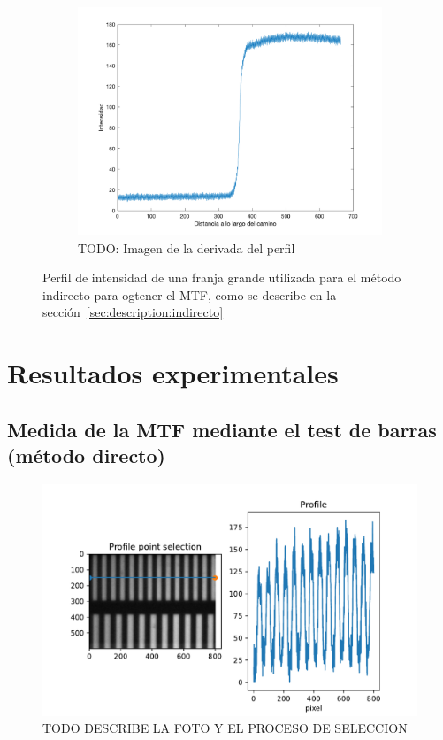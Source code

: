 \documentclass{./packages/optica-article}
\begin{document}
\begin{figure}[hptb]
\begin{subfigure}[b]{0.25\textwidth}
		\includegraphics[width=\textwidth]{edge_perfil}
		\caption{TODO: Imagen de la derivada del perfil}
		\label{fig:perfil:lsf}
	\end{subfigure}
	\caption{Perfil de intensidad de una franja grande utilizada para el método indirecto para ogtener el MTF, como se describe en la sección~\ref{sec:description:indirecto}}
	\label{fig:perfil}
\end{figure}

\section{Resultados experimentales}

\subsection{Medida de la MTF mediante el test de barras (método directo)}\label{sec:mtf-directo}



\begin{figure}[p]
	\includegraphics[width=\textwidth]{profile-lines.pdf}
	\caption{TODO DESCRIBE LA FOTO Y EL PROCESO DE SELECCION}
	\label{fig:example}
\end{figure}
\end{document}
